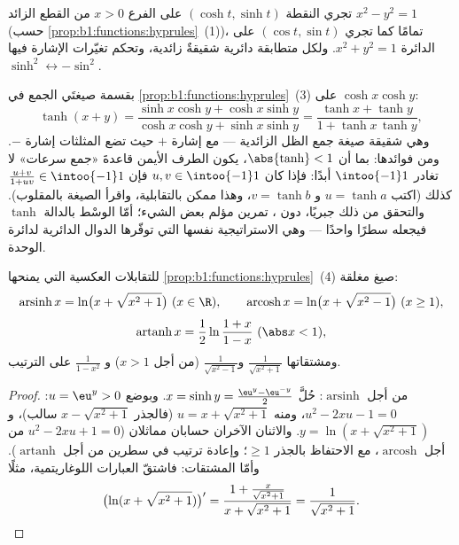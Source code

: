 \begin{remark}
تجري النقطة $(\cosh t, \sinh t)$ على الفرع $x > 0$ من
القطع الزائد $x^2 - y^2 = 1$ (حسب
\cref{prop:b1:functions:hyprules}~(1))، تمامًا كما تجري $(\cos t, \sin
t)$ على الدائرة $x^2 + y^2 = 1$. ولكل متطابقة دائرية
شقيقةٌ زائدية، وتحكم تغيّرات الإشارة فيها
$\sinh^2 \leftrightarrow -\sin^2$.
\end{remark}

\begin{example}\label{ex:b1:functions:tanhadd}
بقسمة صيغتَي الجمع في
\cref{prop:b1:functions:hyprules}~(3) على $\cosh x\cosh y$:
\[
\tanh(x + y)
= \frac{\sinh x\cosh y + \cosh x\sinh y}
{\cosh x\cosh y + \sinh x\sinh y}
= \frac{\tanh x + \tanh y}{1 + \tanh x\,\tanh y} ,
\]
وهي شقيقة صيغة جمع الظل الزائدية --- مع إشارة
$+$ حيث تضع المثلثات إشارة $-$. ومن فوائدها: بما أن $\abs{\tanh}
< 1$، يكون الطرف الأيمن قاعدةَ «جمع سرعات» لا
تغادر $\intoo{-1}1$ أبدًا: فإذا كان $u, v \in \intoo{-1}1$ فإن
$\frac{u + v}{1 + uv} \in \intoo{-1}1$ كذلك (اكتب $u = \tanh
a$ و $v = \tanh b$، وهذا ممكن بالتقابلية، واقرأ الصيغة
بالمقلوب). والتحقق من ذلك جبريًا، دون ،
تمرين مؤلم بعض الشيء؛ أمّا الوسْط بالدالة $\tanh$
فيجعله سطرًا واحدًا --- وهي الاستراتيجية نفسها التي توفّرها
الدوال الدائرية لدائرة الوحدة.
\end{example}

\begin{proposition}\label{prop:b1:functions:invhyp}
للتقابلات العكسية التي يمنحها \cref{prop:b1:functions:hyprules}~(4)
صيغ مغلقة:
\[
\operatorname{arsinh} x = \ln\bigl(x + \sqrt{x^2 + 1}\bigr)
\ (x \in \R),
\qquad
\operatorname{arcosh} x = \ln\bigl(x + \sqrt{x^2 - 1}\bigr)
\ (x \geq 1),
\]
\[
\operatorname{artanh} x = \frac 12 \ln\frac{1 + x}{1 - x}
\ (\abs x < 1),
\]
ومشتقاتها $\frac{1}{\sqrt{x^2+1}}$ و$\frac{1}{\sqrt{x^2-1}}$
(من أجل $x > 1$) و $\frac{1}{1 - x^2}$ على الترتيب.
\end{proposition}

\begin{proof}
من أجل $\operatorname{arsinh}$: حُلَّ $x = \sinh y = \frac{\eu^y -
\eu^{-y}}{2}$. وبوضع $u = \eu^y > 0$: $u^2 - 2xu - 1 = 0$، ومنه $u = x
+ \sqrt{x^2 + 1}$ (فالجذر $x - \sqrt{x^2+1}$ سالب)، و$y =
\ln(x + \sqrt{x^2+1})$. والاثنان الآخران حسابان مماثلان
($u^2 - 2xu + 1 = 0$ من أجل $\operatorname{arcosh}$، مع الاحتفاظ بالجذر
$\geq 1$؛ وإعادة ترتيب في سطرين من أجل $\operatorname{artanh}$).
وأمّا المشتقات: فاشتقّ العبارات اللوغاريتمية، مثلًا
\[
\bigl(\ln(x + \sqrt{x^2+1})\bigr)'
= \frac{1 + \frac{x}{\sqrt{x^2+1}}}{x + \sqrt{x^2+1}}
= \frac{1}{\sqrt{x^2 + 1}} . \qedhere
\]
\end{proof}


